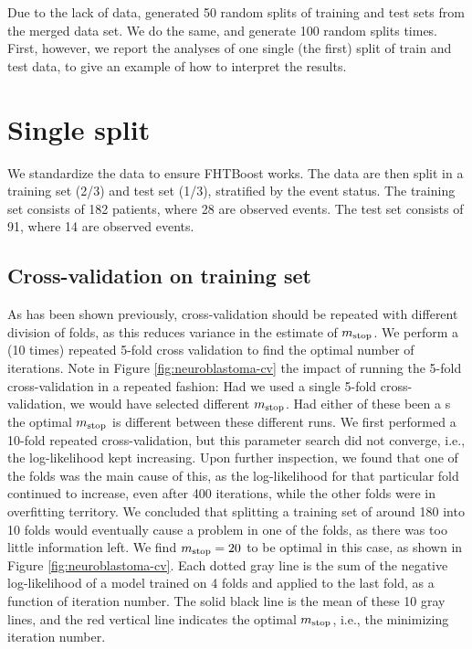 Due to the lack of data, \citet{bovelstad2009} generated 50 random splits of training and test sets from the merged data set.
We do the same, and generate 100 random splits times.
First, however, we report the analyses of one single (the first) split of train and test data, to give an example of how to interpret the results.

\section{Single split}
We standardize the data to ensure FHTBoost works.
The data are then split in a training set (2/3) and test set (1/3), stratified by the event status.
The training set consists of 182 patients, where 28 are observed events.
The test set consists of 91, where 14 are observed events.

\subsection{Cross-validation on training set}
As has been shown previously, cross-validation should be repeated with different division of folds, as this reduces variance in the estimate of $m_{\text{stop}}$.
We perform a (10 times) repeated 5-fold cross validation to find the optimal number of iterations.
Note in Figure \ref{fig:neuroblastoma-cv} the impact of running the 5-fold cross-validation in a repeated fashion:
Had we used a single 5-fold cross-validation, we would have selected different $m_{\text{stop}}$.
Had either of these been a s the optimal $m_{\text{stop}}$ is different between these different runs.
We first performed a 10-fold repeated cross-validation, but this parameter search did not converge, i.e., the log-likelihood kept increasing.
Upon further inspection, we found that one of the folds was the main cause of this, as the log-likelihood for that particular fold continued to increase, even after 400 iterations, while the other folds were in overfitting territory.
We concluded that splitting a training set of around 180 into 10 folds would eventually cause a problem in one of the folds, as there was too little information left.
We find $m_{\text{stop}}=20$ to be optimal in this case, as shown in Figure \ref{fig:neuroblastoma-cv}.
Each dotted gray line is the sum of the negative log-likelihood of a model trained on 4 folds and applied to the last fold, as a function of iteration number.
The solid black line is the mean of these 10 gray lines, and the red vertical line indicates the optimal $m_{\text{stop}}$, i.e., the minimizing iteration number.

